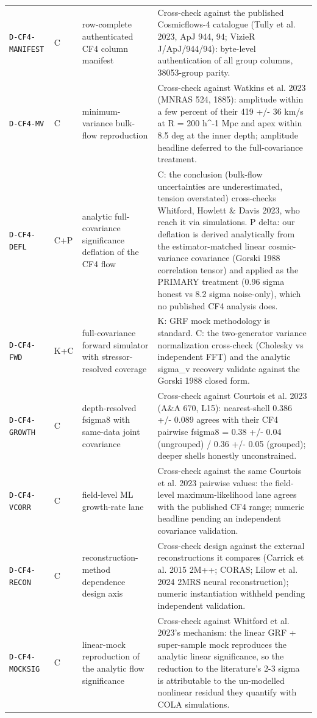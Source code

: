 \documentclass[10pt]{article}
\theoremstyle{definition}
\newcommand{\code}[1]{\texttt{\small #1}}
\begin{document}
\begin{center}
\begin{longtable}{p{2.0cm} p{0.7cm} p{5.4cm} p{6.5cm}}
\code{D-CF4-MANIFEST} & C & row-complete authenticated CF4 column manifest & Cross-check against the published Cosmicflows-4 catalogue (Tully et al. 2023, ApJ 944, 94; VizieR J/ApJ/944/94): byte-level authentication of all group columns, 38053-group parity. \\[2pt]
\code{D-CF4-MV} & C & minimum-variance bulk-flow reproduction & Cross-check against Watkins et al. 2023 (MNRAS 524, 1885): amplitude within a few percent of their 419 +/- 36 km/s at R = 200 h\^{}-1 Mpc and apex within 8.5 deg at the inner depth; amplitude headline deferred to the full-covariance treatment. \\[2pt]
\code{D-CF4-DEFL} & C+P & analytic full-covariance significance deflation of the CF4 flow & C: the conclusion (bulk-flow uncertainties are underestimated, tension overstated) cross-checks Whitford, Howlett \& Davis 2023, who reach it via simulations. P delta: our deflation is derived analytically from the estimator-matched linear cosmic-variance covariance (Gorski 1988 correlation tensor) and applied as the PRIMARY treatment (0.96 sigma honest vs 8.2 sigma noise-only), which no published CF4 analysis does. \\[2pt]
\code{D-CF4-FWD} & K+C & full-covariance forward simulator with stressor-resolved coverage & K: GRF mock methodology is standard. C: the two-generator variance normalization cross-check (Cholesky vs independent FFT) and the analytic sigma\_v recovery validate against the Gorski 1988 closed form. \\[2pt]
\code{D-CF4-GROWTH} & C & depth-resolved fsigma8 with same-data joint covariance & Cross-check against Courtois et al. 2023 (A\&A 670, L15): nearest-shell 0.386 +/- 0.089 agrees with their CF4 pairwise fsigma8 = 0.38 +/- 0.04 (ungrouped) / 0.36 +/- 0.05 (grouped); deeper shells honestly unconstrained. \\[2pt]
\code{D-CF4-VCORR} & C & field-level ML growth-rate lane & Cross-check against the same Courtois et al. 2023 pairwise values: the field-level maximum-likelihood lane agrees with the published CF4 range; numeric headline pending an independent covariance validation. \\[2pt]
\code{D-CF4-RECON} & C & reconstruction-method dependence design axis & Cross-check design against the external reconstructions it compares (Carrick et al. 2015 2M++; CORAS; Lilow et al. 2024 2MRS neural reconstruction); numeric instantiation withheld pending independent validation. \\[2pt]
\code{D-CF4-MOCKSIG} & C & linear-mock reproduction of the analytic flow significance & Cross-check against Whitford et al. 2023's mechanism: the linear GRF + super-sample mock reproduces the analytic linear significance, so the reduction to the literature's 2-3 sigma is attributable to the un-modelled nonlinear residual they quantify with COLA simulations. \\[2pt]

\end{longtable}
\end{center}
\end{document}
